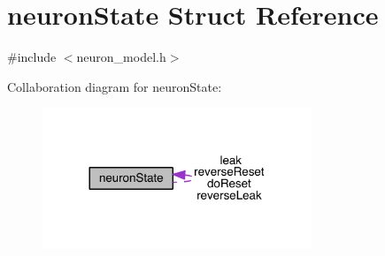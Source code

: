 \hypertarget{structneuron_state}{}\section{neuron\+State Struct Reference}
\label{structneuron_state}


{\ttfamily \#include $<$neuron\+\_\+model.\+h$>$}



Collaboration diagram for neuron\+State\+:\nopagebreak
\begin{figure}[H]
\begin{center}
\leavevmode
\includegraphics[width=228pt]{structneuron_state__coll__graph}
\end{center}
\end{figure}
